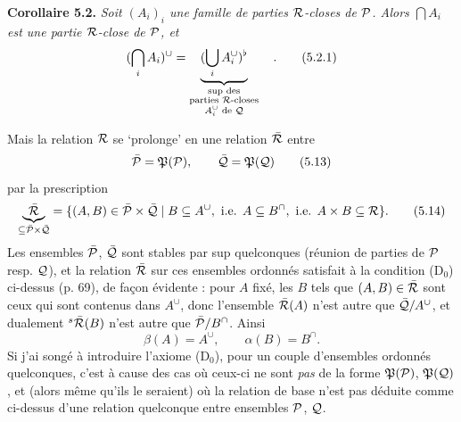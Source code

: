 \textbf{Corollaire 5.2.} \textit{Soit $(A_i)_i$ une famille de parties $\mathcal{R}$-closes de $\mathcal{P}$. Alors $\bigcap A_i$ est une partie $\mathcal{R}$-close de $\mathcal{P}$, et}
\[
(\bigcap_i A_i)^{\cup} = \underbrace{(\bigcup_i A_i^{\cup})^{\flat}}_{\substack{\text{sup des}\\ \text{parties } \mathcal{R}\text{-closes}\\ A_i^{\cup} \text{ de } \mathcal{Q}}} \quad .
\tag*{(5.2.1)}
\]

Mais la relation $\mathcal{R}$ se `prolonge' en une relation $\bar{\mathcal{R}}$ entre
\[
\bar{\mathcal{P}} = \mathfrak{P}(\mathcal{P}), \qquad \bar{\mathcal{Q}} = \mathfrak{P}(\mathcal{Q})
\tag*{(5.13)}
\]
par la prescription
\[
\underbrace{\bar{\mathcal{R}}}_{\subseteq \bar{\mathcal{P}} \times \bar{\mathcal{Q}}} = \{(A,B) \in \bar{\mathcal{P}} \times \bar{\mathcal{Q}} \mid B \subseteq A^{\cup},\ \text{i.e. } A \subseteq B^{\cap},\ \text{i.e. } A \times B \subseteq \mathcal{R}\}.
\tag*{(5.14)}
\]
Les ensembles $\bar{\mathcal{P}}$, $\bar{\mathcal{Q}}$ sont stables par sup quelconques (réunion de parties de $\mathcal{P}$ resp. $\mathcal{Q}$), et la relation $\bar{\mathcal{R}}$ sur ces ensembles ordonnés satisfait à la condition (D$_0$)
ci-dessus (p. 69), de façon évidente : pour $A$ fixé, les $B$ tels que $(A,B) \in \bar{\mathcal{R}}$ sont ceux qui sont contenus dans $A^{\cup}$, donc l'ensemble $\bar{\mathcal{R}}(A)$ n'est autre que $\bar{\mathcal{Q}}/A^{\cup}$, et dualement ${}^{s}\bar{\mathcal{R}}(B)$ n'est autre que $\bar{\mathcal{P}}/B^{\cap}$. Ainsi
\[
\beta(A) = A^{\cup}, \qquad \alpha(B) = B^{\cap}.
\tag*{(5.14)} %
\]
Si j'ai songé à introduire l'axiome (D$_0$), pour un couple d'ensembles ordonnés quelconques, c'est à cause des cas où ceux-ci ne sont \textit{pas} de la forme $\mathfrak{P}(\mathcal{P})$, $\mathfrak{P}(\mathcal{Q})$, et (alors même qu'ils le seraient) où la relation de base n'est pas déduite comme ci-dessus d'une relation quelconque entre ensembles $\mathcal{P}$, $\mathcal{Q}$.

